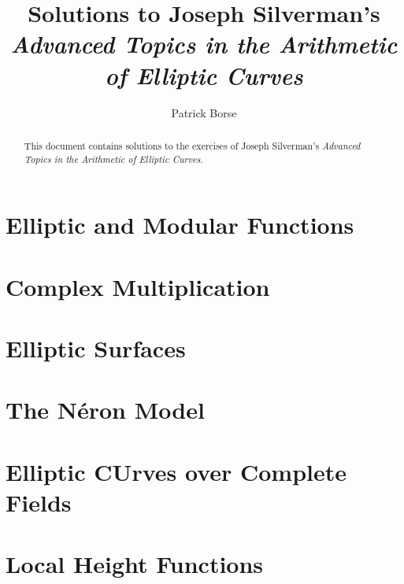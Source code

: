 \documentclass[oneside]{amsbook}
\title{Solutions to Joseph Silverman's\\ \emph{Advanced Topics in the Arithmetic of Elliptic Curves}}
\author{Patrick Borse}
\begin{document}
\begin{abstract}
This document contains solutions to the exercises of Joseph Silverman's \emph{Advanced Topics in the Arithmetic of Elliptic Curves}.
\end{abstract}

\maketitle

\tableofcontents

\chapter{Elliptic and Modular Functions}


\chapter{Complex Multiplication}


\chapter{Elliptic Surfaces}


\chapter{The Néron Model}


\chapter{Elliptic CUrves over Complete Fields}


\chapter{Local Height Functions}

\end{document}
